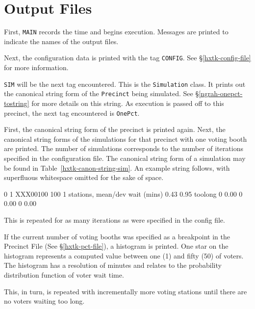 %

\chapter{Output Files} \label{hxtk-outfiles}

First, \texttt{MAIN} records the time and begins execution. Messages are printed to indicate the names of the output files.

Next, the configuration data is printed with the tag \texttt{CONFIG}. See \S\ref{hxtk-config-file} for more information.

\texttt{SIM} will be the next tag encountered. This is the \texttt{Simulation} class. It prints out the canonical string form of the \texttt{Precinct} being simulated. See \S\ref{ngrah-onepct-tostring} for more details on this string. As execution is passed off to this precinct, the next tag encountered is \texttt{OnePct}.

First, the canonical string form of the precinct is printed again. Next, the canonical string forms of the simulations for that precinct with one voting booth are printed. The number of simulations corresponds to the number of iterations specified in the configuration file. The canonical string form of a simulation may be found in Table~\ref{hxtk-canon-string-sim}. An example string follows, with superfluous whitespace omitted for the sake of space.

\vspace{1.0cm}

0 1 XXX00100 100 1 stations, mean/dev wait (mins) 0.43 0.95 toolong 0 0.00 0 0.00 0 0.00

\vspace{1.0cm}

This is repeated for as many iterations as were specified in the config file.

If the current number of voting booths was specified as a breakpoint in the Precinct File (See \S\ref{hxtk-pct-file}), a histogram is printed. One star on the histogram represents a computed value between one (1) and fifty (50) of voters. The histogram has a resolution of minutes and relates to the probability distribution function of voter wait time.

This, in turn, is repeated with incrementally more voting stations until there are no voters waiting too long.


